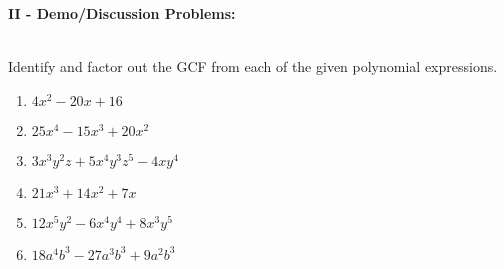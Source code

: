 \documentclass[12pt]{article}
\theoremstyle{definition}
\begin{document}
{\bf II - Demo/Discussion Problems:}\\
\ \par
Identify and factor out the GCF from each of the given polynomial expressions.
\begin{multicols}{2}
\begin{enumerate}
\item $4 x^2 - 20 x + 16$
\item $25 x^4 - 15 x^3 + 20 x^2$
\item $3 x^3 y^2 z + 5 x^4 y^3 z^5 - 4 x y^4$		
\item $21 x^3 + 14 x^2 + 7 x$
\item $12 x^5 y^2 - 6 x^4 y^4 + 8 x^3 y^5$
\item $18 a^4 b^3 - 27 a^3 b^3 + 9 a^2 b^3$
\end{enumerate}
\end{multicols}
\end{document}
